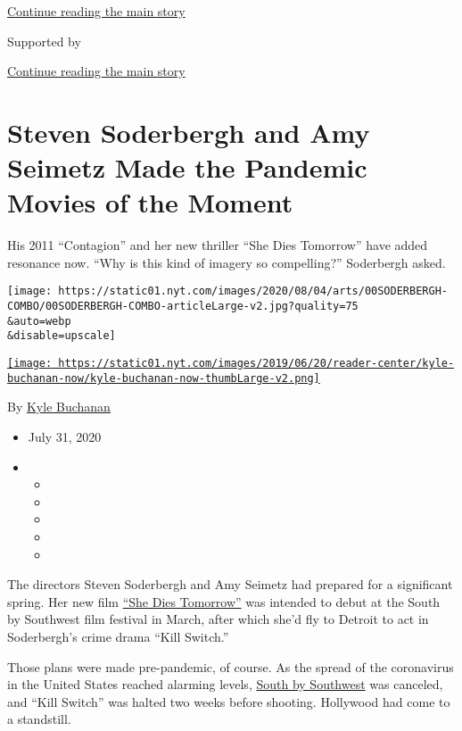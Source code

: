 \protect\hyperlink{after-top}{Continue reading the main story}

Supported by

\protect\hyperlink{after-sponsor}{Continue reading the main story}

\hypertarget{steven-soderbergh-and-amy-seimetz-made-the-pandemic-movies-of-the-moment}{%
\section{Steven Soderbergh and Amy Seimetz Made the Pandemic Movies of
the
Moment}\label{steven-soderbergh-and-amy-seimetz-made-the-pandemic-movies-of-the-moment}}

His 2011 ``Contagion'' and her new thriller ``She Dies Tomorrow'' have
added resonance now. ``Why is this kind of imagery so compelling?''
Soderbergh asked.

\texttt{[image: https://static01.nyt.com/images/2020/08/04/arts/00SODERBERGH-COMBO/00SODERBERGH-COMBO-articleLarge-v2.jpg?quality=75\\\&auto=webp\\\&disable=upscale]}

\href{https://www.nytimes.com/by/kyle-buchanan}{\texttt{[image: https://static01.nyt.com/images/2019/06/20/reader-center/kyle-buchanan-now/kyle-buchanan-now-thumbLarge-v2.png]}}

By \href{https://www.nytimes.com/by/kyle-buchanan}{Kyle Buchanan}

\begin{itemize}
\item
  July 31, 2020
\item
  \begin{itemize}
  \item
  \item
  \item
  \item
  \item
  \end{itemize}
\end{itemize}

The directors Steven Soderbergh and Amy Seimetz had prepared for a
significant spring. Her new film
\href{https://www.youtube.com/watch?v=hcMFjCPkP3M}{``She Dies
Tomorrow''} was intended to debut at the South by Southwest film
festival in March, after which she'd fly to Detroit to act in
Soderbergh's crime drama ``Kill Switch.''

Those plans were made pre-pandemic, of course. As the spread of the
coronavirus in the United States reached alarming levels,
\href{https://www.nytimes.com/2020/03/06/arts/music/sxsw-cancelled.html}{South
by Southwest} was canceled, and ``Kill Switch'' was halted two weeks
before shooting. Hollywood had come to a standstill.

